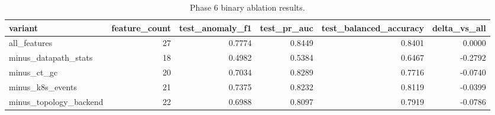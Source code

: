 \begin{table}[t]
\centering
\caption{Phase 6 binary ablation results.}
\label{tab:phase6_ablation_binary}
\begin{tabular}{lrrrrr}
\hline
variant & feature\_count & test\_anomaly\_f1 & test\_pr\_auc & test\_balanced\_accuracy & delta\_vs\_all \\
\hline
all\_features & 27 & 0.7774 & 0.8449 & 0.8401 & 0.0000 \\
minus\_datapath\_stats & 18 & 0.4982 & 0.5384 & 0.6467 & -0.2792 \\
minus\_ct\_gc & 20 & 0.7034 & 0.8289 & 0.7716 & -0.0740 \\
minus\_k8s\_events & 21 & 0.7375 & 0.8232 & 0.8119 & -0.0399 \\
minus\_topology\_backend & 22 & 0.6988 & 0.8097 & 0.7919 & -0.0786 \\
\hline
\end{tabular}
\end{table}
